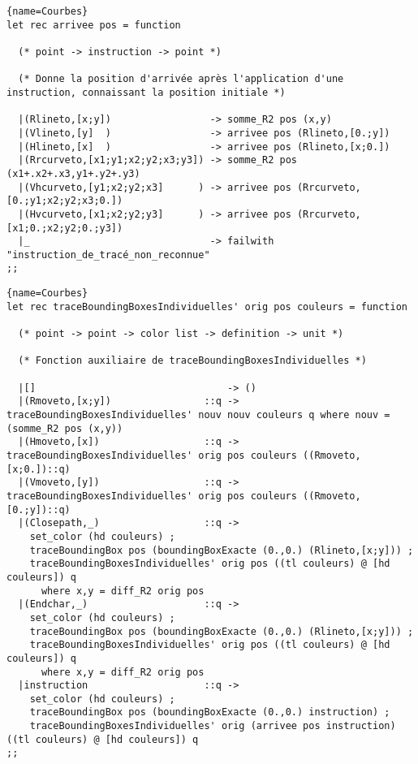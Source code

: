 \documentclass[10pt,twoside,a4paper]{article}
\begin{document}
\pagebreak
\begin{lstlisting}{name=Courbes}
let rec arrivee pos = function

  (* point -> instruction -> point *)

  (* Donne la position d'arrivée après l'application d'une instruction, connaissant la position initiale *)

  |(Rlineto,[x;y])                 -> somme_R2 pos (x,y)
  |(Vlineto,[y]  )                 -> arrivee pos (Rlineto,[0.;y])
  |(Hlineto,[x]  )                 -> arrivee pos (Rlineto,[x;0.])
  |(Rrcurveto,[x1;y1;x2;y2;x3;y3]) -> somme_R2 pos (x1+.x2+.x3,y1+.y2+.y3)
  |(Vhcurveto,[y1;x2;y2;x3]      ) -> arrivee pos (Rrcurveto,[0.;y1;x2;y2;x3;0.])
  |(Hvcurveto,[x1;x2;y2;y3]      ) -> arrivee pos (Rrcurveto,[x1;0.;x2;y2;0.;y3])
  |_                               -> failwith "instruction_de_tracé_non_reconnue"
;;
\end{lstlisting}

\begin{lstlisting}{name=Courbes}
let rec traceBoundingBoxesIndividuelles' orig pos couleurs = function

  (* point -> point -> color list -> definition -> unit *)

  (* Fonction auxiliaire de traceBoundingBoxesIndividuelles *)

  |[]                                 -> ()
  |(Rmoveto,[x;y])                ::q -> traceBoundingBoxesIndividuelles' nouv nouv couleurs q where nouv = (somme_R2 pos (x,y))
  |(Hmoveto,[x])                  ::q -> traceBoundingBoxesIndividuelles' orig pos couleurs ((Rmoveto,[x;0.])::q)
  |(Vmoveto,[y])                  ::q -> traceBoundingBoxesIndividuelles' orig pos couleurs ((Rmoveto,[0.;y])::q)
  |(Closepath,_)                  ::q -> 
    set_color (hd couleurs) ;
    traceBoundingBox pos (boundingBoxExacte (0.,0.) (Rlineto,[x;y])) ;
    traceBoundingBoxesIndividuelles' orig pos ((tl couleurs) @ [hd couleurs]) q
      where x,y = diff_R2 orig pos
  |(Endchar,_)                    ::q ->
    set_color (hd couleurs) ;
    traceBoundingBox pos (boundingBoxExacte (0.,0.) (Rlineto,[x;y])) ;
    traceBoundingBoxesIndividuelles' orig pos ((tl couleurs) @ [hd couleurs]) q
      where x,y = diff_R2 orig pos
  |instruction                    ::q ->
    set_color (hd couleurs) ;
    traceBoundingBox pos (boundingBoxExacte (0.,0.) instruction) ;
    traceBoundingBoxesIndividuelles' orig (arrivee pos instruction) ((tl couleurs) @ [hd couleurs]) q
;;
\end{lstlisting}
\end{document}
